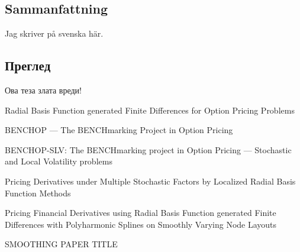 \documentclass{UUThesisTemplate}
\begin{document}
\frontmatter
    \frontmatterCS

   \dedication{``These violent delights have violent ends''\\(Romeo and Juliet: Act 2, Scene 6, Line 9)}
   
\begin{swedish}
\chapter*{Sammanfattning}
Jag skriver på svenska här.
\end{swedish}

\begin{serbian}
\chapter*{Преглед}
\noindent Ова теза злата вреди!
\end{serbian}

    \begin{listofpapers}
    	\item Radial Basis Function generated Finite Differences for Option Pricing Problems \label{paper1}
	\item BENCHOP --- The BENCHmarking Project in Option Pricing  \label{paper2}
	\item BENCHOP-SLV: The BENCHmarking project in Option Pricing --- Stochastic and Local Volatility problems \label{paper4}
	\item Pricing Derivatives under Multiple Stochastic Factors by Localized Radial Basis Function Methods \label{paper3}
	\item Pricing Financial Derivatives using Radial Basis Function generated Finite Differences with Polyharmonic Splines on Smoothly Varying Node Layouts \label{paper5}
	\item SMOOTHING PAPER TITLE \label{paper6}
    \end{listofpapers}


    \begingroup
        \tableofcontents
    \endgroup
\end{document}
